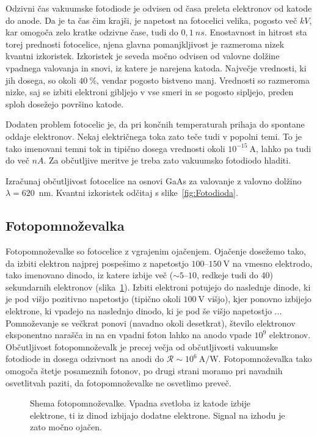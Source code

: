 Odzivni čas vakuumske fotodiode je odvisen od časa preleta elektronov od katode do anode. 
Da je ta čas čim krajši, je napetost na fotocelici velika, pogosto več $\si{kV}$,
kar omogoča zelo kratke odzivne čase, tudi do $0,1~\si{ns}$. 
Enostavnost in hitrost sta torej prednosti fotocelice, 
njena glavna pomanjkljivost je razmeroma nizek kvantni izkoristek. 
Izkoristek je seveda močno odvisen od valovne dolžine vpadnega valovanja in snovi, iz 
katere je narejena katoda. Največje vrednosti, ki jih dosega, so okoli $40~\%$, vendar
pogosto bistveno manj. 
Vrednosti so razmeroma nizke, saj se izbiti elektroni gibljejo v vse
smeri in se pogosto sipljejo, preden sploh dosežejo površino katode. 

Dodaten problem fotocelic je, da pri končnih temperaturah prihaja do spontane oddaje elektronov.
Nekaj električnega toka zato teče tudi v popolni temi. To je tako imenovani temni 
tok 
in tipično dosega vrednosti okoli $10^{-15}~\si{\ampere}$, lahko pa tudi do več $\si{nA}$. 
Za občutljive meritve je treba zato vakuumsko fotodiodo hladiti. 

\begin{definition}
Izračunaj občutljivost fotocelice na osnovi GaAs 
za valovanje z valovno dolžino $\lambda=620$~nm.
Kvantni izkoristek odčitaj s slike~\ref{fig:Fotodioda}.
\end{definition}

\subsection*{Fotopomnoževalka}
Fotopomnoževalke so fotocelice z vgrajenim ojačenjem. Ojačenje dosežemo tako, da 
izbiti elektron najprej pospešimo z napetostjo $100$--$150~\si{\volt}$ na vmesno elektrodo, 
tako imenovano dinodo, iz katere izbije več ($\sim 5$--$10$, redkeje tudi do 40) 
sekundarnih elektronov (slika~\ref{fig:PMT}). 
Izbiti elektroni 
potujejo do naslednje dinode, ki je pod višjo pozitivno napetostjo (tipično okoli $100~\si{\volt}$
višjo), kjer ponovno izbijejo elektrone, ki vpadejo na naslednjo dinodo, 
ki je pod še višjo napetostjo ... 
Pomnoževanje se večkrat ponovi (navadno okoli desetkrat),
število elektronov eksponentno narašča in na en vpadni foton lahko na anodo vpade $10^9$ elektronov. 
Občutljivost fotopomnoževalk je  precej večja od občutljivosti vakuumske fotodiode in
dosega odzivnost na anodi do $\mathcal{R}\sim 10^6~\si{\ampere/\watt}$.
Fotopomnoževalka tako omogoča štetje posameznih fotonov, po drugi strani moramo pri 
navadnih osvetlitvah paziti, da fotopomnoževalke ne osvetlimo preveč. 
\begin{figure}[ht]
\centering
\def\svgwidth{80truemm} 

\caption{Shema fotopomnoževalke. Vpadna svetloba iz katode izbije elektrone, ti 
iz dinod izbijajo dodatne elektrone. Signal na izhodu je zato močno ojačen. }
\label{fig:PMT}
\end{figure}

